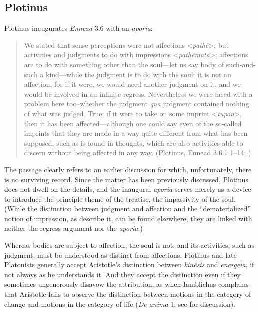 \documentclass[12pt]{article}
\begin{document}
\subsection{Plotinus} %
\label{sub:plotinus}

Plotinus inaugurates \emph{Ennead} 3.6 with an \emph{aporia}:
\begin{quote}
	We stated that sense perceptions were not affections <\emph{pathê}>, but activities and judgments to do with impressions <\emph{pathêmata}>; affections are to do with something other than the soul---let us say body of such-and-such a kind---while the judgment is to do with the soul; it is not an affection, for if it were, we would need another judgment on it, and we would be involved in an infinite regress. Nevertheless we were faced with a problem here too--whether the judgment \emph{qua} judgment contained nothing of what was judged. True; if it were to take on some imprint <\emph{tupon}>, then it has been affected---although one could say even of the so-called imprints that they are made in a way quite different from what has been supposed, such as is found in thoughts, which are also activities able to discern without being affected in any way. (Plotinus, Ennead 3.6.1 1--14; \citealt[3]{Fleet:1995gf})
\end{quote}
The passage clearly refers to an earlier discussion for which, unfortunately, there is no surviving record. Since the matter has been previously discussed, Plotinus does not dwell on the details, and the inaugural \emph{aporia} serves merely as a device to introduce the principle theme of the treatise, the impassivity of the soul. (While the distinction between judgment and affection and the ``dematerialized'' notion of impression, as \citealt[292]{Dillon:2015yf} describe it, can be found elsewhere, they are linked with neither the regress argument nor the \emph{aporia}.) 

Whereas bodies are subject to affection, the soul is not, and its activities, such as judgment, must be understood as distinct from affections. Plotinus and late Platonists generally accept Aristotle's distinction between \emph{kinêsis} and \emph{energeia}, if not always as he understands it. And they accept the distinction even if they sometimes ungenerously disavow the attribution, as when Iamblichus complains that Aristotle fails to observe the distinction between motions in the category of change and motions in the category of life (\emph{De anima} 1; see \citealt[76--77]{Finamore:2002yf} for discussion). 
\end{document}
